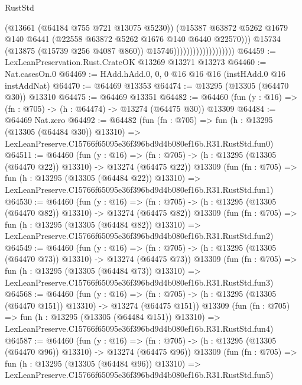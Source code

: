 \begin{lexlean}{RustStd}
\begin{coremodule}
                                            (@13661 (@64184 @755 @721 @13075 @5230))
                                            (@15387
                                              @63872
                                              @5262
                                              @1679
                                              @140
                                              @6441
                                              (@22558 @63872 @5262 @1676 @140 @6440 @22570)))
                                          @15734
                                          (@13875 (@15739 @256 @4087 @860))
                                          @15746)))))))))))))))))))
@64459 := LexLeanPreservation.Rust.CrateOK @13269 @13271 @13273
@64460 := Nat.casesOn.{0}
@64469 := HAdd.hAdd.{0, 0, 0} @16 @16 @16 (instHAdd.{0} @16 instAddNat)
@64470 := @64469 @13353
@64474 := @13295 (@13305 (@64470 @30)) @13310
@64475 := @64469 @13351
@64482 := @64460 (fun (y : @16) => (fn : @705) -> (h : @64474) -> @13274 (@64475 @30)) @13309
@64484 := @64469 Nat.zero
@64492 := @64482
    (fun (fn : @705) =>
    fun (h : @13295 (@13305 (@64484 @30)) @13310) =>
    LexLeanPreserve.C15766f65095e36f396bd9d4b080ef16b.R31.RustStd.fun0)
@64511 := @64460
    (fun (y : @16) =>
    (fn : @705) -> (h : @13295 (@13305 (@64470 @22)) @13310) -> @13274 (@64475 @22))
    @13309
    (fun (fn : @705) =>
    fun (h : @13295 (@13305 (@64484 @22)) @13310) =>
    LexLeanPreserve.C15766f65095e36f396bd9d4b080ef16b.R31.RustStd.fun1)
@64530 := @64460
    (fun (y : @16) =>
    (fn : @705) -> (h : @13295 (@13305 (@64470 @82)) @13310) -> @13274 (@64475 @82))
    @13309
    (fun (fn : @705) =>
    fun (h : @13295 (@13305 (@64484 @82)) @13310) =>
    LexLeanPreserve.C15766f65095e36f396bd9d4b080ef16b.R31.RustStd.fun2)
@64549 := @64460
    (fun (y : @16) =>
    (fn : @705) -> (h : @13295 (@13305 (@64470 @73)) @13310) -> @13274 (@64475 @73))
    @13309
    (fun (fn : @705) =>
    fun (h : @13295 (@13305 (@64484 @73)) @13310) =>
    LexLeanPreserve.C15766f65095e36f396bd9d4b080ef16b.R31.RustStd.fun3)
@64568 := @64460
    (fun (y : @16) =>
    (fn : @705) -> (h : @13295 (@13305 (@64470 @151)) @13310) -> @13274 (@64475 @151))
    @13309
    (fun (fn : @705) =>
    fun (h : @13295 (@13305 (@64484 @151)) @13310) =>
    LexLeanPreserve.C15766f65095e36f396bd9d4b080ef16b.R31.RustStd.fun4)
@64587 := @64460
    (fun (y : @16) =>
    (fn : @705) -> (h : @13295 (@13305 (@64470 @96)) @13310) -> @13274 (@64475 @96))
    @13309
    (fun (fn : @705) =>
    fun (h : @13295 (@13305 (@64484 @96)) @13310) =>
    LexLeanPreserve.C15766f65095e36f396bd9d4b080ef16b.R31.RustStd.fun5)

\end{coremodule}
\end{lexlean}
